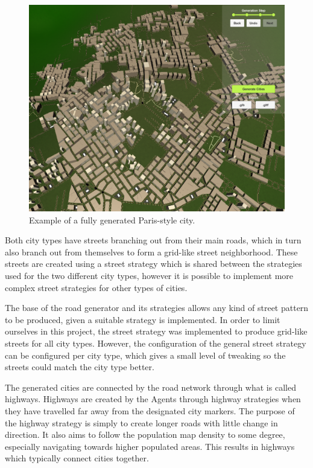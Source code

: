 \begin{figure}[H]
\begin{minipage}{.45\textwidth}
\begin{minipage}{.9\textwidth}
      \includegraphics[width=\textwidth]{figure/results/city_paris.png}
      \caption{Example of a fully generated Paris-style city.}
      \label{fig:results_city_paris}
    \end{minipage}
  \end{minipage}
\end{figure}

Both city types have streets branching out from their main roads, which in turn also branch out from themselves to form a grid-like street neighborhood.
These streets are created using a street strategy which is shared between the strategies used for the two different city types, however it is possible to implement more complex street strategies for other types of cities.

The base of the road generator and its strategies allows any kind of street pattern to be produced, given a suitable strategy is implemented.
In order to limit ourselves in this project, the street strategy was implemented to produce grid-like streets for all city types.
However, the configuration of the general street strategy can be configured per city type, which gives a small level of tweaking so the streets could match the city type better.

The generated cities are connected by the road network through what is called highways.
Highways are created by the Agents through highway strategies when they have travelled far away from the designated city markers.
The purpose of the highway strategy is simply to create longer roads with little change in direction.
It also aims to follow the population map density to some degree, especially navigating towards higher populated areas.
This results in highways which typically connect cities together.

